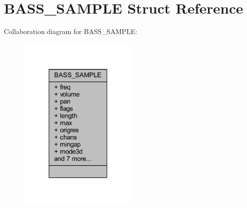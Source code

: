 \hypertarget{struct_b_a_s_s___s_a_m_p_l_e}{\section{B\-A\-S\-S\-\_\-\-S\-A\-M\-P\-L\-E Struct Reference}
\label{struct_b_a_s_s___s_a_m_p_l_e}
}


Collaboration diagram for B\-A\-S\-S\-\_\-\-S\-A\-M\-P\-L\-E\-:\nopagebreak
\begin{figure}[H]
\begin{center}
\leavevmode
\includegraphics[width=168pt]{struct_b_a_s_s___s_a_m_p_l_e__coll__graph}
\end{center}
\end{figure}
